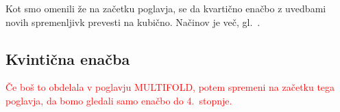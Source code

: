 Kot smo omenili že na začetku poglavja, se da kvartično enačbo z uvedbami novih spremenljivk prevesti na kubično. Načinov je več, gl.\ \cite{wikiquartic}.


\subsection{Kvintična enačba}

\textcolor{red}{Če boš to obdelala v poglavju MULTIFOLD, potem spremeni na začetku tega poglavja, da bomo gledali samo enačbo do 4.\ stopnje.}
